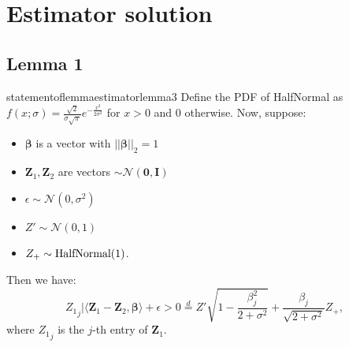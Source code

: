 \documentclass{article} %
\begin{document}



\newpage

\appendix

\section{Estimator solution}
\label{estimatorproof}

\subsection{Lemma 1}

\begin{restatable}{statementoflemma}{estimatorlemma3}
\label{estimatorlemma3}
Define the PDF of \textnormal{HalfNormal} as $f(x; \sigma) = \frac{\sqrt{2}}{\sigma\sqrt{\pi}}e^{-\frac{x^2}{2\sigma^2}}$ for $x>0$ and 0 otherwise. Now, suppose:
\begin{itemize}
\item $\bm{\beta}$ is a vector with $||\bm{\beta}||_2=1$ \item $\mathbf{Z}_1, \mathbf{Z}_2$ are vectors $\sim \mathcal{N}(\mathbf{0},\mathbf{I})$
\item $\epsilon \sim \mathcal{N}(0,\sigma^2)$
\item $Z' \sim \mathcal{N}(0,1)$
\item $Z_+ \sim \textnormal{HalfNormal}(1)$.
\end{itemize}
Then we have:
\[
{Z_1}_j | \langle \mathbf{Z}_1 - \mathbf{Z}_2, \bm{\beta} \rangle + \epsilon > 0 \overset{d}{=} Z'\sqrt{1-\frac{\beta_j^2}{2 + \sigma^2}} + \frac{\beta_j}{\sqrt{2+\sigma^2}} Z_{+},
\]
where ${Z_1}_j$ is the $j$-th entry of $\mathbf{Z}_1$.
\end{restatable}
\end{document}
